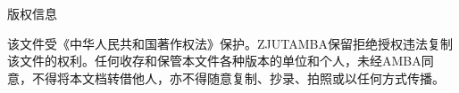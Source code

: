 \newpage
\thispagestyle{empty}
\centering
版权信息
\vspace{10pt}

\raggedright
\hspace{24pt}该文件受《中华人民共和国著作权法》保护。ZJUTAMBA保留拒绝授权违法复制该文件的权利。任何收存和保管本文件各种版本的单位和个人，未经AMBA同意，不得将本文档转借他人，亦不得随意复制、抄录、拍照或以任何方式传播。